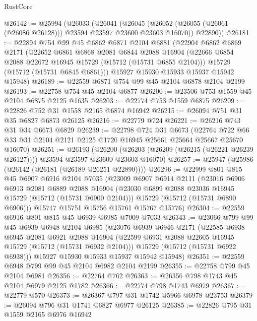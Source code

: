 \begin{lexlean}{RustCore}
\begin{coremodule}
@26142 := @25994
    (@26033
      (@26041
        (@26045 (@26052 (@26055 (@26061 (@26086 @26128))) @23594 @23597 @23600 @23603 @16070))
        @22890))
@26181 := @22894
    @754
    @99
    @45
    @6862
    @6871
    @2104
    @6881
    (@22904
      @6862
      @6869
      @2171
      (@22652
        @6861
        @6868
        @2081
        @6844
        @2088
        @16904
        (@22666 @6854 @2088 @22672 @16945 @15729 (@15712 (@15731 @6855 @2104)))
        @15729
        (@15712 (@15731 @6845 @6861)))
      @15927
      @15930
      @15933
      @15937
      @15942
      @15948)
@26189 := @22559 @6871 @754 @99 @45 @2104 @6878 @2104 @2199
@26193 := @22758 @754 @45 @2104 @6877
@26200 := @23506 @753 @1559 @45 @2104 @6875 @2125 @1635
@26203 := @22774 @753 @1559 @6875
@26209 := @22826 @752 @31 @1558 @2165 @6874 @16942
@26215 := @26094 @751 @31 @35 @6827 @6873 @26125
@26216 := @22779 @724
@26221 := @26216 @743 @31 @34 @6673 @6829
@26239 := @22798
    @724
    @31
    @6673
    (@22764 @722 @66 @33 @31 @2104 @2121 @2125 @1720 @16945 @25661 @25664 @25667 @25670 @16070)
@26251 := @26193
    (@26200 (@26203 (@26209 (@26215 (@26221 @26239 @26127)))) @23594 @23597 @23600 @23603 @16070)
@26257 := @25947 (@25986 (@26142 (@26181 (@26189 @26251 @22890))))
@26296 := @22999
    @801
    @815
    @45
    @6907
    @6916
    @2104
    @7035
    (@23009
      @6907
      @6914
      @2111
      (@23016
        @6906
        @6913
        @2081
        @6889
        @2088
        @16904
        (@23030 @6899 @2088 @23036 @16945 @15729 (@15712 (@15731 @6900 @2104)))
        @15729
        (@15712 (@15731 @6890 @6906)))
      @15747
      @15751
      @15756
      @15761
      @15767
      @15776)
@26304 := @22559 @6916 @801 @815 @45 @6939 @6985 @7009 @7033
@26343 := @23066
    @799
    @99
    @45
    @6939
    @6948
    @2104
    @6985
    (@23076
      @6939
      @6946
      @2171
      (@22585
        @6938
        @6945
        @2081
        @6921
        @2088
        @16904
        (@22599 @6931 @2088 @22605 @16945 @15729 (@15712 (@15731 @6932 @2104)))
        @15729
        (@15712 (@15731 @6922 @6938)))
      @15927
      @15930
      @15933
      @15937
      @15942
      @15948)
@26351 := @22559 @6948 @799 @99 @45 @2104 @6982 @2104 @2199
@26355 := @22758 @799 @45 @2104 @6981
@26356 := @22764 @762
@26363 := @26356 @798 @1743 @45 @2104 @6979 @2125 @1782
@26366 := @22774 @798 @1743 @6979
@26367 := @22779 @570
@26373 := @26367 @797 @31 @1742 @5966 @6978 @23753
@26379 := @26094 @796 @31 @1741 @6827 @6977 @26125
@26385 := @22826 @795 @31 @1559 @2165 @6976 @16942

\end{coremodule}
\end{lexlean}
